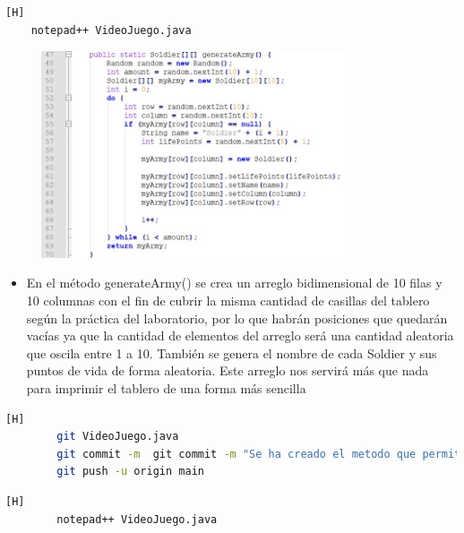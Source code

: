 \documentclass{article}
\begin{document}
	
	
		
	\begin{lstlisting}[language=bash,caption={ Se crea un método para generar el arreglo bidimensional de tipo Soldier }][H]
	notepad++ VideoJuego.java	
	\end{lstlisting}
	
	\begin{figure}[H]
		\centering
		\includegraphics[width=0.8\textwidth,keepaspectratio]{img/2.jpg}
	\end{figure}
	
	\begin{itemize}	
		\item En el método generateArmy() se crea un arreglo bidimensional de 10 filas y 10 columnas con el fin de cubrir la misma cantidad de casillas del tablero según la práctica del laboratorio, por lo que habrán posiciones que quedarán vacías ya que la cantidad de elementos del arreglo será una cantidad aleatoria que oscila entre 1 a 10. También se genera el nombre de cada Soldier y sus puntos de vida de forma aleatoria. Este arreglo nos servirá más que nada para imprimir el tablero de una forma más sencilla
	\end{itemize}	
		
	\begin{lstlisting}[language=bash,caption={Commit: Se ha creado el metodo que permite generar un arreglo de soldados sin repetir posiciones }][H]
		git VideoJuego.java
		git commit -m  git commit -m "Se ha creado el metodo que permite generar un arreglo de soldados sin repetir posiciones"
		git push -u origin main
	\end{lstlisting}
	
	
	
	\begin{lstlisting}[language=bash,caption={ Se crea un metodo que genera un arreglo unidimensional  }][H]
		notepad++ VideoJuego.java	
	\end{lstlisting}
	
\end{document}
